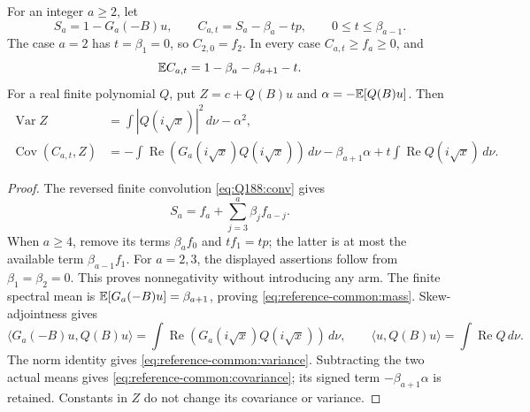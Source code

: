 \begin{lemma}
\label{lem:reference-common:receiving}
For an integer \(a\ge2\), let
\[
 S_a=1-G_a(-B)u,\qquad C_{a,t}=S_a-\beta_a-tp,
 \qquad 0\le t\le\beta_{a-1}.
\]
The case \(a=2\) has \(t=\beta_1=0\), so
\(C_{2,0}=f_2\). In every case \(C_{a,t}\ge f_a\ge0\), and
\begin{equation}\label{eq:reference-common:mass}
 \mathbb E C_{a,t}=1-\beta_a-\beta_{a+1}-t.
\end{equation}
For a real finite polynomial \(Q\), put
\(Z=c+Q(B)u\) and \(\alpha=-\mathbb E[Q(B)u]\). Then
\begin{align}
 \operatorname{Var}Z&=\int|Q(i\sqrt x)|^2\,d\nu-\alpha^2,
 \label{eq:reference-common:variance}\\
 \operatorname{Cov}(C_{a,t},Z)
 &=-\int\operatorname{Re}(G_a(i\sqrt x)Q(i\sqrt x))\,d\nu
   -\beta_{a+1}\alpha
   +t\int\operatorname{Re}Q(i\sqrt x)\,d\nu.
 \label{eq:reference-common:covariance}
\end{align}
\end{lemma}
\begin{proof}
The reversed finite convolution \eqref{eq:Q188:conv} gives
\[
 S_a=f_a+\sum_{j=3}^{a}\beta_j f_{a-j}.
\]
When \(a\ge4\), remove its terms \(\beta_a f_0\) and
\(t f_1=tp\); the latter is at most the available term
\(\beta_{a-1}f_1\). For \(a=2,3\), the displayed assertions
follow from \(\beta_1=\beta_2=0\). This proves nonnegativity
without introducing any arm. The finite spectral mean is
\(\mathbb E[G_a(-B)u]=\beta_{a+1}\), proving
\eqref{eq:reference-common:mass}.
Skew-adjointness gives
\[
 \langle G_a(-B)u,Q(B)u\rangle
   =\int\operatorname{Re}(G_a(i\sqrt x)Q(i\sqrt x))\,d\nu,
 \qquad
 \langle u,Q(B)u\rangle=\int\operatorname{Re}Q\,d\nu.
\]
The norm identity gives \eqref{eq:reference-common:variance}.
Subtracting the two actual means gives
\eqref{eq:reference-common:covariance}; its signed term
\(-\beta_{a+1}\alpha\) is retained. Constants in \(Z\) do
not change its covariance or variance.
\end{proof}

